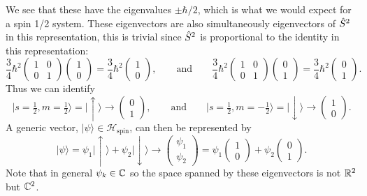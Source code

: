 \documentclass[a4paper]{article}
\renewcommand{\ket}[1]{\vert {#1} \rangle}
\newcommand{\hilbert}{\mathcal{H}}
\newcommand{\spinUp}{\uparrow}
\newcommand{\spinDown}{\downarrow}
\newcommand{\representation}{\mathbin{\rightarrow}}
\theoremstyle{definition}
\begin{document}
    We see that these have the eigenvalues \(\pm\hbar/2\), which is what we would expect for a spin 1/2 system.
    These eigenvectors are also simultaneously eigenvectors of \(\hat{S}^2\) in this representation, this is trivial since \(\hat{S}^2\) is proportional to the identity in this representation:
    \[
        \frac{3}{4}\hbar^2
        \begin{pmatrix}
            1 & 0\\
            0 & 1
        \end{pmatrix}
        \begin{pmatrix}
            1\\ 0
        \end{pmatrix}
        = \frac{3}{4}\hbar^2
        \begin{pmatrix}
            1\\ 0
        \end{pmatrix}
        ,\qquad\text{and}\qquad
        \frac{3}{4}\hbar^2
        \begin{pmatrix}
            1 & 0\\
            0 & 1
        \end{pmatrix}
        \begin{pmatrix}
            0\\ 1
        \end{pmatrix}
        = \frac{3}{4}\hbar^2
        \begin{pmatrix}
            0\\ 1
        \end{pmatrix}
        .
    \]
    Thus we can identify
    \[
        \ket{s=\tfrac{1}{2}, m=\tfrac{1}{2}} = \ket{\spinUp} \representation 
        \begin{pmatrix}
            0\\ 1
        \end{pmatrix}
        ,\qquad\text{and}\qquad
        \ket{s = \tfrac{1}{2}, m=-\tfrac{1}{2}} = \ket{\spinDown} \representation
        \begin{pmatrix}
            1\\ 0
        \end{pmatrix}
        .
    \]
    A generic vector, \(\ket{\psi}\in\hilbert_{\text{spin}}\), can then be represented by
    \[
        \ket{\psi} = \psi_1\ket{\spinUp} + \psi_2\ket{\spinDown} \representation
        \begin{pmatrix}
            \psi_1\\
            \psi_2
        \end{pmatrix}
        =
        \psi_1
        \begin{pmatrix}
            1\\ 0
        \end{pmatrix}
        + \psi_2
        \begin{pmatrix}
            0\\ 1
        \end{pmatrix}
        .
    \]
    Note that in general \(\psi_k\in\mathbb{C}\) so the space spanned by these eigenvectors is not \(\mathbb{R}^2\) but \(\mathbb{C}^2\).
    
\end{document}
